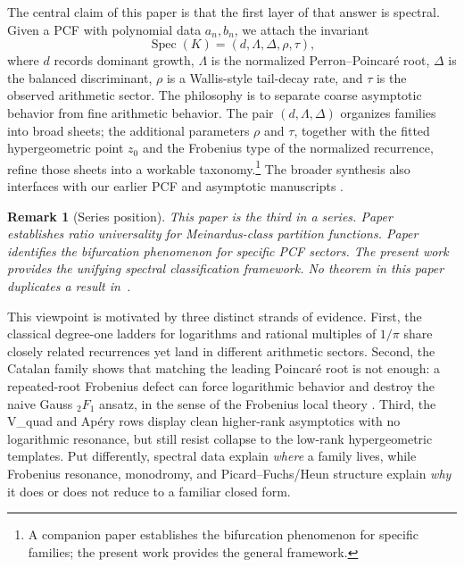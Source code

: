 \documentclass[11pt]{article}
\newtheorem{remark}[theorem]{Remark}
\begin{document}
The central claim of this paper is that the first layer of that answer is spectral. Given a PCF with polynomial data $a_n,b_n$, we attach the invariant
\[
\operatorname{Spec}(K)=(d,\Lambda,\Delta,\rho,\tau),
\]
where $d$ records dominant growth, $\Lambda$ is the normalized Perron--Poincar\'e root, $\Delta$ is the balanced discriminant, $\rho$ is a Wallis-style tail-decay rate, and $\tau$ is the observed arithmetic sector. The philosophy is to separate coarse asymptotic behavior from fine arithmetic behavior. The pair $(d,\Lambda,\Delta)$ organizes families into broad sheets; the additional parameters $\rho$ and $\tau$, together with the fitted hypergeometric point $z_0$ and the Frobenius type of the normalized recurrence, refine those sheets into a workable taxonomy.\footnote{A companion paper \cite{pcf_bifurcation_2026} establishes the bifurcation phenomenon for specific families; the present work provides the general framework.} The broader synthesis also interfaces with our earlier PCF and asymptotic manuscripts \cite{pcf_unified_2026,ratio_universality_2026}.

\begin{remark}[Series position]
This paper is the third in a series. Paper~\cite{ratio_universality_2026} establishes ratio universality for Meinardus-class partition functions. Paper~\cite{pcf_bifurcation_2026} identifies the bifurcation phenomenon for specific PCF sectors. The present work provides the unifying spectral classification framework. No theorem in this paper duplicates a result in~\cite{ratio_universality_2026,pcf_bifurcation_2026}.
\end{remark}

This viewpoint is motivated by three distinct strands of evidence. First, the classical degree-one ladders for logarithms and rational multiples of $1/\pi$ share closely related recurrences yet land in different arithmetic sectors. Second, the Catalan family shows that matching the leading Poincar\'e root is not enough: a repeated-root Frobenius defect can force logarithmic behavior and destroy the naive Gauss ${}_2F_1$ ansatz, in the sense of the Frobenius local theory \cite{frobenius1873}. Third, the V\_quad and Ap\'ery rows display clean higher-rank asymptotics with no logarithmic resonance, but still resist collapse to the low-rank hypergeometric templates. Put differently, spectral data explain \emph{where} a family lives, while Frobenius resonance, monodromy, and Picard--Fuchs/Heun structure explain \emph{why} it does or does not reduce to a familiar closed form.
\end{document}
